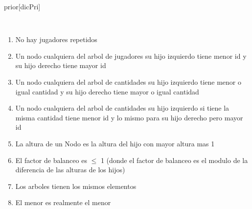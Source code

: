 \begin{Representacion}

	\begin{Estructura}{prior}[dicPri]
		\begin{Tupla}[dicPri]
		\end{Tupla}

		~ 

		\begin{Tupla}[Nodo]
		\end{Tupla}
	\end{Estructura}


	\begin{enumerate}
		
		\item No hay jugadores repetidos

		\item Un nodo cualquiera del arbol de jugadores su hijo izquierdo tiene menor id y su hijo derecho tiene mayor id

		\item Un nodo cualquiera del arbol de cantidades su hijo izquierdo tiene menor o igual cantidad y su hijo derecho tiene mayor o igual cantidad

		\item Un nodo cualquiera del arbol de cantidades su hijo izquierdo si tiene la misma cantidad tiene menor id y lo mismo para su hijo derecho pero mayor id

		\item La altura de un Nodo es la altura del hijo con mayor altura mas 1

		\item El factor de balanceo es $\leq$ 1 (donde el factor de balanceo es el modulo de la diferencia de las alturas de los hijos)

		\item Los arboles tienen los mismos elementos

		\item El menor es realmente el menor

	\end{enumerate}
	

\end{Representacion}
